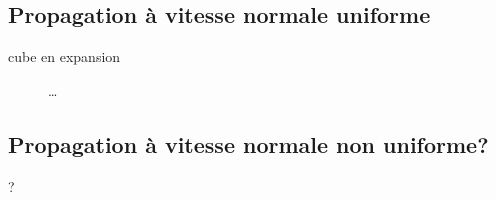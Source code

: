 \subsection{Propagation à vitesse normale uniforme}
cube en expansion
\begin{figure}
	\centering
	\newdimen\imwid
	\linewidth
	\caption{\ldots}
	\label{fig:snapshots_cube}
\end{figure}

\subsection{Propagation à vitesse normale non uniforme?}
?
